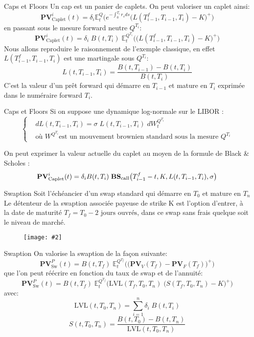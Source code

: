 \documentclass{beamer}
\newcommand{\FIG}[2]{\texttt{[image: \#2]}}
\begin{document}
\begin{frame}{Caps et Floors}
Un cap est un panier de caplets. On peut valoriser un caplet ainsi:
\[
\textbf{PV}_\text{Caplet}^i(t)=\delta_i \mathbb{E}_t^{Q}\Big(e^{-\int_0^{T_i} r_s ds}\big(L(T_ {i-1}^f,T_{i-1},T_i)-K\big)^+\Big)
\]
en passant sous le mesure forward neutre $Q^{T_i}$:
\[
\textbf{PV}_\text{Caplet}^i(t)=\delta_i \;B(t,T_i)\;\mathbb{E}_t^{Q^{T_i}}\Big(\big(L(T_ {i-1}^f,T_{i-1},T_i)-K\big)^+\Big)
\]
Nous allons reproduire le raisonnement de l'exemple classique, en effet $L(T_ {i-1}^f,T_{i-1},T_i)$ est une martingale sous $Q^{T_i}$:
\[
L(t,T_{i-1},T_i)= \frac{B(t,T_{i-1})-B(t,T_i)}{B(t,T_i)}
\]
C'est la valeur d'un prêt forward qui démarre en $T_{i-1}$ et mature en $T_i$ exprimée dans le numéraire forward $T_i$.
\end{frame}

\begin{frame}{Caps et Floors}
Si on suppose une dynamique log-normale sur le LIBOR :
\[
\left\{
\begin{split}
&dL(t,T_{i-1},T_i)=\sigma\;L(t,T_{i-1},T_i) \;dW_t^{Q^{T_i}}\\
&\text{où } W^{Q^{T_i}}\text{est un mouvement brownien standard sous la mesure }Q^{T_i}
\end{split}
\right.
\]

On peut exprimer la valeur actuelle du caplet au moyen de la formule de Black \& Scholes  :
\[
\textbf{PV}_\text{Caplet}^i(t)=\delta_i B(t,T_i) \;\text{\textbf{BS}}_\text{call}\big(T_{i-1}^f-t,K,L(t,T_{i-1},T_i),\sigma\big)
\]

\end{frame}

\begin{frame}{Swaption}
Soit l'échéancier d'un swap standard qui démarre en $T_0$ et mature en $T_n$\\
Le détenteur de la swaption associée payeuse de strike K est l'option d'entrer, à la date de maturité $T_f=T_0-2\text{ jours ouvrés}$,  dans ce swap sans frais quelque soit le niveau de marché.
\begin{figure}[h]
\FIG{10cm}{figures/schema_swaption.jpg}
\end{figure}
\end{frame}
\begin{frame}{Swaption}
On valorise la swaption de la façon suivante:
\[
\textbf{PV}_\text{Sw}^P(t)=B(t,T_f)\;\mathbb{E}_t^{Q^{T_f}}\Big(\big(\textbf{PV}_V(T_f)-\textbf{PV}_F(T_f)\big)^+\Big)
\]
que l'on peut réécrire en fonction du taux de swap et de l'annuité:
\[
\textbf{PV}_\text{Sw}^P(t)=B(t,T_f)\;\mathbb{E}_t^{Q^{T_f}}\Big(\text{LVL}(T_f,T_0,T_n)\;\big(S(T_f,T_0,T_n)-K\big)^+\Big)
\]
avec:
\[
\text{LVL}(t,T_0,T_n)=\sum_{i=1}^{n}\delta_i \;B(t,T_i)
\]
\[
S(t,T_0,T_n)= \frac{B(t,T_0)-B(t,T_n)}{\text{LVL}(t,T_0,T_n)}
\]
\end{frame}
\end{document}
